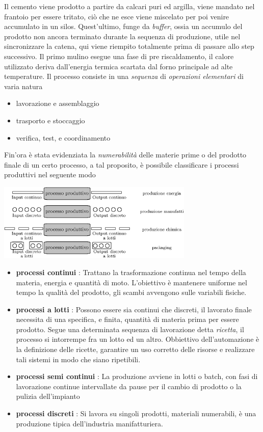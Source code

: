 \documentclass[10pt, letterpaper]{report}
\begin{document}
Il cemento viene prodotto a partire da calcari puri ed argilla, viene mandato nel frantoio per essere 
tritato, ciò che ne esce viene miscelato per poi venire accumulato in un silos. Quest'ultimo, funge 
da \textit{buffer}, ossia un accumulo del prodotto non ancora terminato durante la sequenza di produzione, utile 
nel sincronizzare la catena, qui 
viene riempito totalmente prima di passare allo step successivo. Il primo mulino esegue una fase 
di pre riscaldamento, il calore utilizzato deriva dall'energia termica scartata dal forno principale 
ad alte temperature. \acc 
Il processo consiste in una \textit{sequenza} di \textit{operazioni elementari} di varia natura \begin{itemize}
    \item lavorazione  e assemblaggio
    \item trasporto e stoccaggio 
    \item verifica, test, e coordinamento
\end{itemize}
Fin'ora è stata evidenziata la \textit{numerabilità} delle materie prime o del prodotto finale di un certo 
processo, a tal proposito, è possibile classificare i processi produttivi nel seguente 
modo
\begin{center}
    \includegraphics[width=0.7\textwidth ]{images/classificazioneProcProd.eps}
\end{center}
\begin{itemize}
    \item\textbf{processi continui} : Trattano la trasformazione continua nel tempo della materia, energia 
    e quantità di moto. L'obiettivo è mantenere uniforme nel tempo la qualità del prodotto, gli scambi 
    avvengono sulle variabili fisiche.
    \item\textbf{processi a lotti} : Possono essere sia continui che discreti, il lavorato finale necessita 
    di una specifica, e finita, quantità di materia prima per essere prodotto. Segue una determinata 
    sequenza di lavorazione detta \textit{ricetta}, il processo si intorrempe fra un lotto ed un 
    altro. Obbiettivo dell'automazione è la definizione delle ricette, garantire un uso corretto delle 
    risorse e realizzare tali sistemi in modo che siano ripetibili.
    \item\textbf{processi semi continui} : La produzione avviene in lotti o batch, con fasi di lavorazione continue intervallate da pause per il cambio di prodotto o la pulizia dell'impianto
    \item \textbf{processi discreti} : Si lavora su singoli prodotti, materiali numerabili, è una 
    produzione tipica dell'industria manifatturiera.
\end{itemize}
\end{document}
